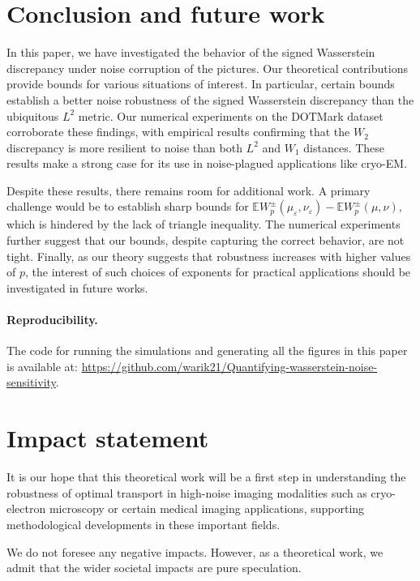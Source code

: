 \documentclass{article}
\theoremstyle{plain}
\theoremstyle{definition}
\theoremstyle{remark}
\begin{document}
\section{Conclusion and future work}


In this paper, we have investigated the behavior of the signed Wasserstein discrepancy under noise corruption of the pictures. Our theoretical contributions provide bounds for various situations of interest. 
In particular, certain bounds establish a better noise robustness of the signed Wasserstein discrepancy than the ubiquitous $L^2$ metric. 
Our numerical experiments on the DOTMark dataset corroborate these findings, with empirical results confirming that the $W_2$ discrepancy is more resilient to noise than both $L^2$ and $W_1$ distances. These results make a strong case for its use in noise-plagued applications like cryo-EM.


Despite these results, there remains room for additional work. A primary challenge would be to establish sharp bounds for 
\( \mathbb{E} W_p^\pm ( \mu_\varepsilon, \nu_\varepsilon) - \mathbb{E} W_p^\pm ( \mu, \nu) \), which is hindered by the lack of triangle inequality. The numerical experiments further suggest that our bounds, despite capturing the correct behavior, are not tight.
Finally, as our theory suggests that robustness increases with higher values of $p$, the interest of such choices of exponents for practical applications should be investigated in future works.

\paragraph{Reproducibility.} The code for running the simulations and generating all the figures in this paper is available at:
{\small\url{https://github.com/warik21/Quantifying-wasserstein-noise-sensitivity}}.

\section*{Impact statement}
It is our hope that this theoretical work will be a first step in understanding the robustness of optimal transport in high-noise imaging modalities such as cryo-electron microscopy or certain medical imaging applications, supporting methodological developments in these important fields.

We do not foresee any negative impacts.
However, as a theoretical work, we admit that the wider societal impacts are pure speculation.
\end{document}
